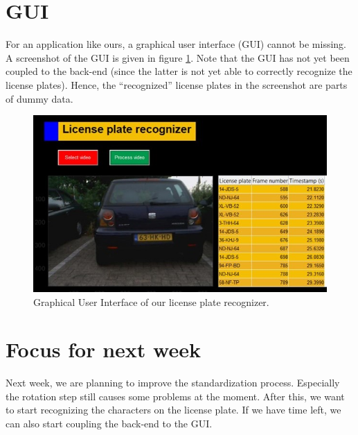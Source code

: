 \documentclass{tudelftposter}
\begin{document}
\section{GUI}
For an application like ours, a graphical user interface (GUI) cannot be missing. A screenshot of the GUI is given in figure \ref{gui}. Note that the GUI has not yet been coupled to the back-end (since the latter is not yet able to correctly recognize the license plates). Hence, the ``recognized'' license plates in the screenshot are parts of dummy data. 

\begin{figure}[h]
	\centering
	\includegraphics[width=1000pt]{gui.jpg}
	\caption{Graphical User Interface of our license plate recognizer.}
	\label{gui}
\end{figure}

\section{Focus for next week}
Next week, we are planning to improve the standardization process. Especially the rotation step still causes some problems at the moment. After this, we want to start recognizing the characters on the license plate. If we have time left, we can also start coupling the back-end to the GUI. 
\end{document}
